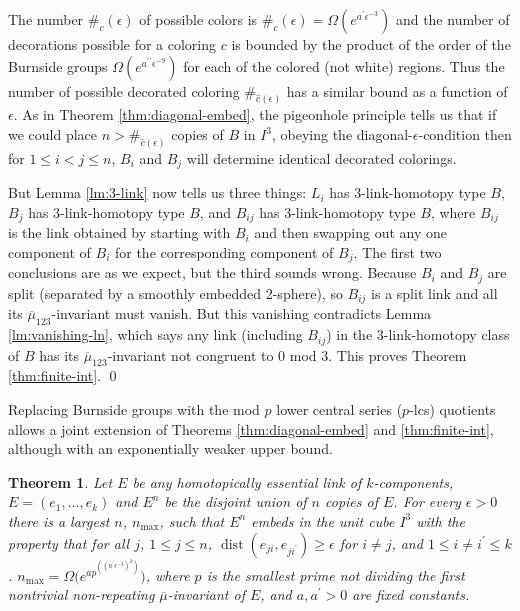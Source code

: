 \documentclass[12pt]{amsart}
\newcommand{\pr}{\prime}
\newcommand{\lbar}[1]{\overline{#1}}
\DeclareMathOperator{\dist}{dist}
\newtheorem{thm}{Theorem}
\theoremstyle{definition}
\theoremstyle{remark}
\begin{document}
The number $\#_c(\epsilon)$ of possible colors is $\#_c(\epsilon) = \Omega(e^{a^\pr \epsilon^{-3}})$ and the number of decorations possible for a coloring $c$ is bounded by the product of the order of the Burnside groups $\Omega(e^{a^{\pr\pr}\epsilon^{-9}})$ for each of the colored (not white) regions. Thus the number of possible decorated coloring $\#_{\hat{c}(\epsilon)}$ has a similar bound as a function of $\epsilon$. As in Theorem \ref{thm:diagonal-embed}, the pigeonhole principle tells us that if we could place $n > \#_{\hat{c}(\epsilon)}$ copies of $B$ in $I^3$, obeying the diagonal-$\epsilon$-condition then for $1 \leq i < j \leq n$, $B_i$ and $B_j$ will determine identical decorated colorings.

But Lemma \ref{lm:3-link} now tells us three things: $L_i$ has 3-link-homotopy type $B$, $B_j$ has 3-link-homotopy type $B$, and $B_{ij}$ has 3-link-homotopy type $B$, where $B_{ij}$ is the link obtained by starting with $B_i$ and then swapping out any one component of $B_i$ for the corresponding component of $B_j$. The first two conclusions are as we expect, but the third sounds wrong. Because $B_i$ and $B_j$ are split (separated by a smoothly embedded 2-sphere), so $B_{ij}$ is a split link and all its $\lbar{\mu}_{123}$-invariant must vanish. But this vanishing contradicts Lemma \ref{lm:vanishing-ln}, which says any link (including $B_{ij}$) in the 3-link-homotopy class of $B$ has its $\lbar{\mu}_{123}$-invariant not congruent to 0 mod 3. This proves Theorem \ref{thm:finite-int}. \qed

Replacing Burnside groups with the mod $p$ lower central series ($p$-lcs) quotients allows a joint extension of Theorems \ref{thm:diagonal-embed} and \ref{thm:finite-int}, although with an exponentially weaker upper bound.

\begin{thm}\label{thm:n-max}
	Let $E$ be any homotopically essential link of $k$-components, $E = (e_1,\dots,e_k)$ and $E^n$ be the disjoint union of $n$ copies of $E$. For every $\epsilon > 0$ there is a largest $n$, $n_{\text{max}}$, such that $E^n$ embeds in the unit cube $I^3$ with the property that for all $j$, $1 \leq j \leq n$, $\dist(e_{ji}, e_{ji^\pr}) \geq \epsilon$ for $i \neq j$, and $1 \leq i \neq i^\pr \leq k$. $n_{\text{max}} = \Omega\Big(e^{ap^{\left((a^\pr \epsilon^{-3})^k\right)}}\Big)$, where $p$ is the smallest prime \emph{not} dividing the first nontrivial non-repeating $\lbar{\mu}$-invariant of $E$, and $a,a^\pr > 0$ are fixed constants.
\end{thm}
\end{document}

